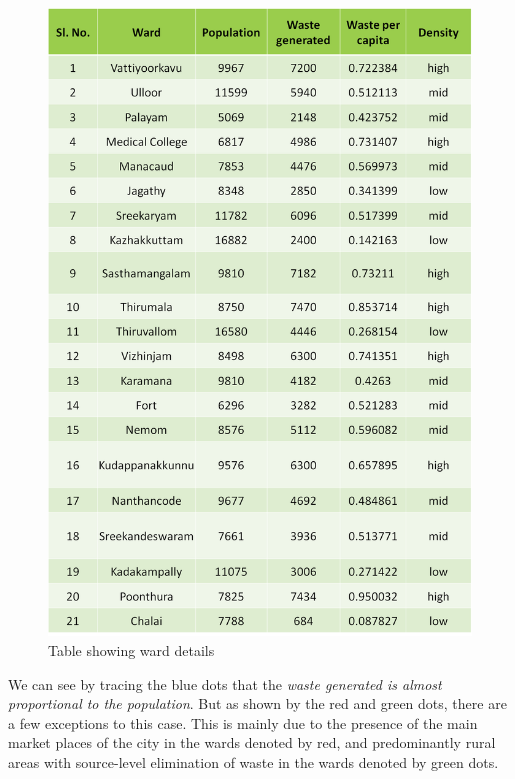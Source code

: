 \documentclass[12pt,a4paper]{report}
\begin{document}
\begin{figure}[H]
	\centering
	\includegraphics[width=1\linewidth]{table_waste_dens}
	\caption{Table showing ward details}
	\label{fig:tablewastedens}
\end{figure}

We can see by tracing the blue dots that the \textit{waste generated is almost proportional to the population}. But as shown by the red and green dots, there are a few exceptions to this case. This is mainly due to the presence of the main market places of the city in the wards denoted by red, and predominantly rural areas with source-level elimination of waste in the wards denoted by green dots.
\end{document}
